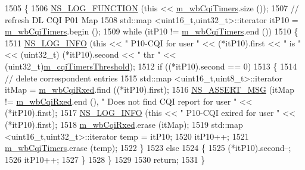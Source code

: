 \begin{DoxyCode}
1505 \{
1506   \hyperlink{log-macros-disabled_8h_a90b90d5bad1f39cb1b64923ea94c0761}{NS\_LOG\_FUNCTION} (\textcolor{keyword}{this} << \hyperlink{classns3_1_1MmWaveFlexTtiMaxRateMacScheduler_acabe6aa89f19153f8ce386a5fad72aed}{m\_wbCqiTimers}.size ());
1507   \textcolor{comment}{// refresh DL CQI P01 Map}
1508   std::map <uint16\_t,uint32\_t>::iterator itP10 = \hyperlink{classns3_1_1MmWaveFlexTtiMaxRateMacScheduler_acabe6aa89f19153f8ce386a5fad72aed}{m\_wbCqiTimers}.begin ();
1509   \textcolor{keywordflow}{while} (itP10 != \hyperlink{classns3_1_1MmWaveFlexTtiMaxRateMacScheduler_acabe6aa89f19153f8ce386a5fad72aed}{m\_wbCqiTimers}.end ())
1510     \{
1511       \hyperlink{group__logging_gafbd73ee2cf9f26b319f49086d8e860fb}{NS\_LOG\_INFO} (\textcolor{keyword}{this} << \textcolor{stringliteral}{" P10-CQI for user "} << (*itP10).first << \textcolor{stringliteral}{" is "} << (uint32\_t)
      (*itP10).second << \textcolor{stringliteral}{" thr "} << (uint32\_t)\hyperlink{classns3_1_1MmWaveFlexTtiMaxRateMacScheduler_a7f29b65f1e4a7c64cf73fe2efd02770f}{m\_cqiTimersThreshold});
1512       \textcolor{keywordflow}{if} ((*itP10).second == 0)
1513         \{
1514           \textcolor{comment}{// delete correspondent entries}
1515           std::map <uint16\_t,uint8\_t>::iterator itMap = \hyperlink{classns3_1_1MmWaveFlexTtiMaxRateMacScheduler_adf66188149ac6a56b4a58f742a27187b}{m\_wbCqiRxed}.find ((*itP10).first);
1516           \hyperlink{assert_8h_aff5ece9066c74e681e74999856f08539}{NS\_ASSERT\_MSG} (itMap != \hyperlink{classns3_1_1MmWaveFlexTtiMaxRateMacScheduler_adf66188149ac6a56b4a58f742a27187b}{m\_wbCqiRxed}.end (), \textcolor{stringliteral}{" Does not find CQI report
       for user "} << (*itP10).first);
1517           \hyperlink{group__logging_gafbd73ee2cf9f26b319f49086d8e860fb}{NS\_LOG\_INFO} (\textcolor{keyword}{this} << \textcolor{stringliteral}{" P10-CQI exired for user "} << (*itP10).first);
1518           \hyperlink{classns3_1_1MmWaveFlexTtiMaxRateMacScheduler_adf66188149ac6a56b4a58f742a27187b}{m\_wbCqiRxed}.erase (itMap);
1519           std::map <uint16\_t,uint32\_t>::iterator temp = itP10;
1520           itP10++;
1521           \hyperlink{classns3_1_1MmWaveFlexTtiMaxRateMacScheduler_acabe6aa89f19153f8ce386a5fad72aed}{m\_wbCqiTimers}.erase (temp);
1522         \}
1523       \textcolor{keywordflow}{else}
1524         \{
1525           (*itP10).second--;
1526           itP10++;
1527         \}
1528     \}
1529 
1530   \textcolor{keywordflow}{return};
1531 \}
\end{DoxyCode}


